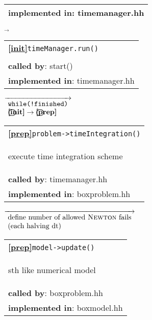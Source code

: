 \begin{landscape}
{\begin{tabular}{|l|}
    \textbf{implemented in}: timemanager.hh \\  
    \hline
  \end{tabular}
    $\overrightarrow{}$
  \begin{tabular}{|l|}\hline
    \textbf{\textcircled{\ref{init}}}\verb+timeManager.run()+\\ 
    \begin{scriptsize}\end{scriptsize}\\
    \textbf{called by}: {start()}\\
    \textbf{implemented in}: {timemanager.hh}\\  
    \hline
  \end{tabular} 
{\scriptsize
    $\overrightarrow{ %
      \begin{array}{l} %
	\textnormal{\texttt{while(!finished)}}\\
	\textbf{\textbf{\textcircled{\ref{init}}}} \rightarrow \textbf{\textcircled{\ref{prep}} }
      \end{array}
    }$}
  \begin{tabular}{|l|}
    \hline
    \textbf{\textcircled{\ref{prep}}}\verb+problem->timeIntegration()+ \\
    \begin{scriptsize}execute time integration scheme \end{scriptsize}\\
    \textbf{called by}: timemanager.hh\\
    \textbf{implemented in}: boxproblem.hh\\  
\hline
  \end{tabular}    
\nextline
    {\scriptsize$\overrightarrow{
      \begin{array}{l}
	\textnormal{define number of allowed \textsc{Newton} fails} \\
	\textnormal{(each halving dt)}
      \end{array}
    }$}
      \begin{tabular}{|l|}
    \hline
    \textbf{\textcircled{\ref{prep}}}\verb+model->update()+ \\
    \begin{scriptsize}sth like numerical model\end{scriptsize}\\
    \textbf{called by}: boxproblem.hh\\
    \textbf{implemented in}: boxmodel.hh\\  

\end{tabular}}
\end{landscape}
